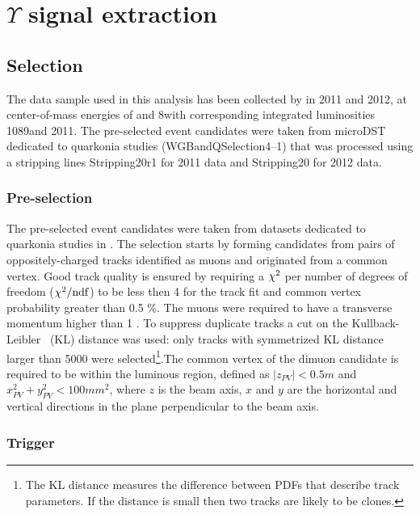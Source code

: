 \section{\texorpdfstring{$\Upsilon$}{Y} signal extraction}
\label{sec:upsilon}

\subsection{Selection}
\label{sec:ups:selelection}
The data sample used in this analysis has been collected by \lhcb in 2011 and
2012, at center-of-mass energies of \tev and 8\tev with corresponding
integrated luminosities 1089\invpb and 2011\invpb.
The pre-selected event candidates were taken from microDST dedicated to
quarkonia studies (WGBandQSelection4--1) that was processed using a 
stripping lines Stripping20r1 for 2011 data and Stripping20 for 2012 data.

\subsubsection{Pre-selection}
\label{sec:upsilon:selelection:preselection}
The pre-selected event candidates were taken from datasets dedicated to
quarkonia studies in \lhcb. The selection starts by forming candidates from
pairs of oppositely-charged tracks identified as muons and originated from a
common vertex. Good track quality is ensured by requiring a $\chi^2$ per number
of degrees of freedom ($\chi^2/\rm{ndf}$) to be less then 4 for the track fit
and common vertex probability greater than 0.5 \%. The muons were required to
have a transverse momentum higher than 1 \gevc. To suppress duplicate tracks a
cut on the Kullback-Leibler~\cite{Needham:1082460} (KL) distance was used: only
tracks with symmetrized KL distance larger than 5000 were selected\footnote{The
KL distance measures the difference between PDFs that describe track
parameters. If the distance is small then two tracks are likely to be
clones.}.The common vertex of the dimuon candidate is required to be within the 
luminous region, defined as $|z_{PV}| < 0.5 m$ and $x_{PV}^2 + y_{PV}^2 < 100
mm^2$, where $z$ is the beam axis, $x$ and $y$ are the horizontal and vertical directions 
in the plane perpendicular to the beam axis.  
\subsubsection{Trigger}
\label{sec:upsilon:selection:trigger}

